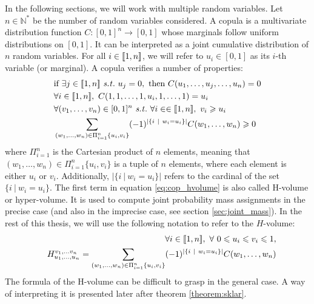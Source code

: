 In the following sections, we will work with multiple random variables. Let $n\in\mathbb{N}^*$ be the number of random variables considered. A copula is a multivariate distribution function $C:[0,1]^{n}\rightarrow [0,1]$ whose marginals follow uniform distributions on $[0,1]$. It can be interpreted as a joint cumulative distribution of $n$ random variables. For all $i\in{[\![} 1,n{]\!]} $, we will refer to $u_i\in[0,1]$ as its $i$-th variable (or marginal). A copula verifies a number of properties:
\begin{align}
    &\text{if }\exists j\in\opi 1,n\cli  \text{ \st }~u_j=0, \text{ then }C(u_1,\dots,u_j,\dots,u_n)=0\label{eq:zero_copula}\\
    &\forall i\in\opi 1,n\cli ,~C(1,1,\dots,1,u_i,1,\dots,1)=u_i\\
    &\forall (v_1,\dots,v_n)\in[0,1]^n \text{ \st }~\forall i\in\in\opi 1,n\cli ,~v_i\geqslant u_i\nonumber\\
    &\sum_{(w_1, \dots, w_n)\in\Pi_{i=1}^n\{u_i, v_i\}}(-1)^{|\{i~|~w_i=u_i\}|}C(w_1, \dots, w_n)\geqslant 0\label{eq:cop_hvolume}
\end{align}
where $\Pi_{i=1}^n$ is the Cartesian product of $n$ elements, meaning that $(w_1, \dots, w_n)\in\Pi_{i=1}^n\{u_i, v_i\}$ is a tuple of $n$ elements, where each element is either $u_i$ or $v_i$. Additionally, $|\{i~|~w_i=u_i\}|$ refers to the cardinal of the set $\{i~|~w_i=u_i\}$. The first term in equation \ref{eq:cop_hvolume} is also called H-volume or hyper-volume. It is used to compute joint probability mass assignments in the precise case (and also in the imprecise case, see section \ref{sec:joint_mass}). In the rest of this thesis, we will use the following notation to refer to the $H$-volume:
\begin{eqnarray}\label{eq:hvolume}
    &&\forall i\in{[\![} 1,n{]\!]} ,~\forall~0\leqslant u_i \leqslant v_i \leqslant 1,\nonumber\\
    &&H^{v_1,\dots v_n}_{u_1,\dots,u_n}=\sum_{(w_1, \dots, w_n)\in\Pi_{i=1}^n\{u_i, v_i\}}(-1)^{|\{i~|~w_i=u_i\}|}C(w_1, \dots, w_n)
\end{eqnarray}
The formula of the H-volume can be difficult to grasp in the general case. A way of interpreting it is presented later after theorem \ref{theorem:sklar}.

